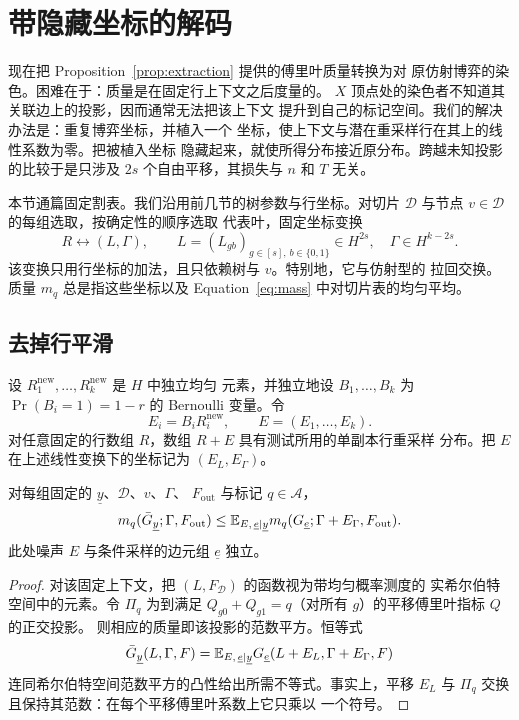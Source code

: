 \section{带隐藏坐标的解码}
\label{sec:decoding}

现在把 Proposition~\ref{prop:extraction} 提供的傅里叶质量转换为对
原仿射博弈的染色。困难在于：质量是在固定行上下文之后度量的。
$X$ 顶点处的染色者不知道其关联边上的投影，因而通常无法把该上下文
提升到自己的标记空间。我们的解决办法是：重复博弈坐标，并植入一个
坐标，使上下文与潜在重采样行在其上的线性系数为零。把被植入坐标
隐藏起来，就使所得分布接近原分布。跨越未知投影的比较于是只涉及
$2s$ 个自由平移，其损失与 $n$ 和 $T$ 无关。

本节通篇固定割表。我们沿用前几节的树参数与行坐标。对切片
$\mathcal D$ 与节点 $v\in\mathcal D$ 的每组选取，按确定性的顺序选取
代表叶，固定坐标变换
\[
 R\longleftrightarrow (L,\Gamma),\qquad
 L=(L_{gb})_{g\in[s],\,b\in\{0,1\}}\in H^{2s},
 \quad \Gamma\in H^{k-2s}.
\]
该变换只用行坐标的加法，且只依赖树与 $v$。特别地，它与仿射型的
拉回交换。质量 $m_q$ 总是指这些坐标以及 Equation~\eqref{eq:mass}
中对切片表的均匀平均。

\subsection{去掉行平滑}

设 $R^{\mathrm{new}}_1,\ldots,R^{\mathrm{new}}_k$ 是 $H$ 中独立均匀
元素，并独立地设 $B_1,\ldots,B_k$ 为 $\Pr(B_i=1)=1-r$ 的 Bernoulli
变量。令
\[
 E_i=B_iR^{\mathrm{new}}_i,
 \qquad E=(E_1,\ldots,E_k).
\]
对任意固定的行数组 $R$，数组 $R+E$ 具有测试所用的单副本行重采样
分布。把 $E$ 在上述线性变换下的坐标记为 $(E_L,E_\Gamma)$。

\begin{lemma}[去掉平滑]\label{lem:unsmooth}
对每组固定的 $\underline y$、$\mathcal D$、$v$、$\Gamma$、
$F_{\mathrm{out}}$ 与标记 $q\in\mathcal A$，
\begin{equation}\label{eq:unsmooth}
 m_q(\bar G_{\underline y};\Gamma,F_{\mathrm{out}})
 \leq
 \mathbb E_{E,\,\underline e\mid\underline y}
 m_q(G_{\underline e};\Gamma+E_\Gamma,F_{\mathrm{out}}).
\end{equation}
此处噪声 $E$ 与条件采样的边元组 $\underline e$ 独立。
\end{lemma}

\begin{proof}
对该固定上下文，把 $(L,F_{\mathcal D})$ 的函数视为带均匀概率测度的
实希尔伯特空间中的元素。令 $\Pi_q$ 为到满足
$Q_{g0}+Q_{g1}=q$（对所有 $g$）的平移傅里叶指标 $Q$ 的正交投影。
则相应的质量即该投影的范数平方。恒等式
\[
 \bar G_{\underline y}(L,\Gamma,F)
 =\mathbb E_{E,\,\underline e\mid\underline y}
 G_{\underline e}(L+E_L,\Gamma+E_\Gamma,F)
\]
连同希尔伯特空间范数平方的凸性给出所需不等式。事实上，平移
$E_L$ 与 $\Pi_q$ 交换且保持其范数：在每个平移傅里叶系数上它只乘以
一个符号。
\end{proof}

